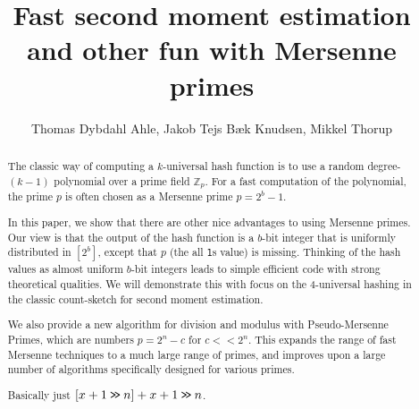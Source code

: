 

\title{Fast second moment estimation and other fun with Mersenne primes} 
\author{Thomas Dybdahl Ahle, Jakob Tejs Bæk Knudsen, Mikkel Thorup}

\maketitle

\begin{abstract}
The classic way of computing a $k$-universal hash function is
to use a random degree-$(k-1)$ polynomial over a prime field $\mathbb Z_p$.
For a fast computation of the polynomial, the prime $p$ is often
chosen as a Mersenne prime $p=2^b-1$.

In this paper, we show that there are other nice advantages to using
Mersenne primes. Our view is that the output of the hash function is a
$b$-bit integer that is uniformly distributed in $[2^b]$, except that
$p$ (the all \texttt1s value) is missing. Thinking of the hash
values as almost uniform $b$-bit integers leads to simple efficient code 
with strong theoretical qualities. We will demonstrate this with focus on the
4-universal hashing in the classic count-sketch for second moment
estimation.

We also provide a new algorithm for division and modulus with Pseudo-Mersenne Primes, which are numbers $p=2^n-c$ for $c<\!< 2^n$.
This expands the range of fast Mersenne techniques to a much large range of primes, and improves upon a large number of algorithms specifically designed for various primes.

Basically just
   $[x+1 \mathbin{\texttt{>\!>}} n]+x+1 \mathbin{\texttt{>\!>}} n$.
\end{abstract}

\tableofcontents

















